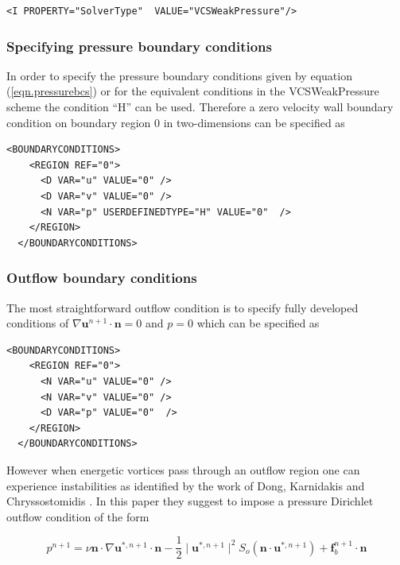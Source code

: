 \begin{lstlisting}[style=XMLStyle]
<I PROPERTY="SolverType"  VALUE="VCSWeakPressure"/>
\end{lstlisting}

\subsubsection{Specifying pressure boundary conditions}

In order to specify the pressure boundary conditions given by equation
(\ref{eqn.pressurebcs}) or for the equivalent conditions in the VCSWeakPressure
scheme the  condition ``H'' can be
used. Therefore a zero velocity wall boundary condition on boundary
region 0 in two-dimensions can be specified as

\begin{lstlisting}[style=XMLStyle]
  <BOUNDARYCONDITIONS>
    <REGION REF="0">
      <D VAR="u" VALUE="0" />
      <D VAR="v" VALUE="0" />
      <N VAR="p" USERDEFINEDTYPE="H" VALUE="0"  />
    </REGION>
  </BOUNDARYCONDITIONS>
\end{lstlisting}


\subsubsection{Outflow boundary conditions}

The most straightforward outflow condition is to specify fully
developed conditions of $\nabla\mathbf{u}^{n+1}\cdot \mathbf{n}=0$ and
$p=0$ which can be specified as 

\begin{lstlisting}[style=XMLStyle]
  <BOUNDARYCONDITIONS>
    <REGION REF="0">
      <N VAR="u" VALUE="0" />
      <N VAR="v" VALUE="0" />
      <D VAR="p" VALUE="0"  />
    </REGION>
  </BOUNDARYCONDITIONS>
\end{lstlisting}

However when energetic vortices pass through an outflow region one can
experience instabilities as identified by the work of Dong, Karnidakis
and Chryssostomidis \cite{DoKa14}. In this paper they suggest to
impose a pressure Dirichlet outflow condition of the form

\begin{equation}
 p^{n+1}= \nu \mathbf{n} \cdot \nabla\mathbf{u}^{*,n+1}\cdot \mathbf{n}-\frac{1}{2}
 \mid \mathbf{u}^{*,n+1} \mid^2 S_o(\mathbf{n}\cdot
 \mathbf{u}^{*,n+1})+\mathbf{f}_b^{n+1}\cdot \mathbf{n}
\end{equation}


